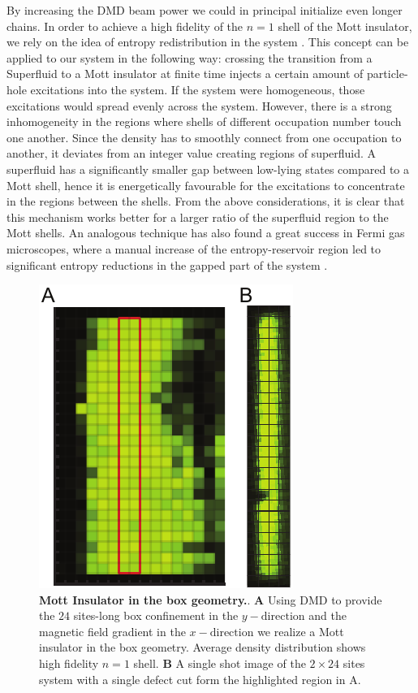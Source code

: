 By increasing the DMD beam power we could in principal initialize even longer chains. In order to achieve a high fidelity of the $n=1$ shell of the Mott insulator, we rely on the idea of entropy redistribution in the system \cite{Ho2009}. This concept can be applied to our system in the following way: crossing the transition from a Superfluid to a Mott insulator at finite time injects a certain amount of particle-hole excitations into the system. If the system were homogeneous, those excitations would spread evenly across the system. However, there is a strong inhomogeneity in the regions where shells of different occupation number touch one another. Since the density has to smoothly connect from one occupation to another, it deviates from an integer value creating regions of superfluid. A superfluid has a significantly smaller gap between low-lying states compared to a Mott shell, hence it is energetically favourable for the excitations to concentrate in the regions between the shells. From the above considerations, it is clear that this mechanism works better for a larger ratio of the superfluid region to the Mott shells. An analogous technique has also found a great success in Fermi gas microscopes, where a manual increase of the entropy-reservoir region led to significant entropy reductions in the gapped part of the system \cite{Mazurenko2017, Chiu2018}.

\begin{figure}[t]
	\centering
	\includegraphics[scale=1]{figures/CTE_MI_box.pdf}
	\caption{{\bf Mott Insulator in the box geometry.}. {\bf A} Using DMD to provide the $24$ sites-long box confinement in the $y-\mathrm{direction}$ and the magnetic field gradient in the $x-\mathrm{direction}$ we realize a Mott insulator in the box geometry. Average density distribution shows high fidelity $n=1$ shell.  {\bf B} A single shot image of the $2\times24$ sites system with a single defect cut form the highlighted region in A.}
	\label{fig:CTE_MI_box}
\end{figure}

